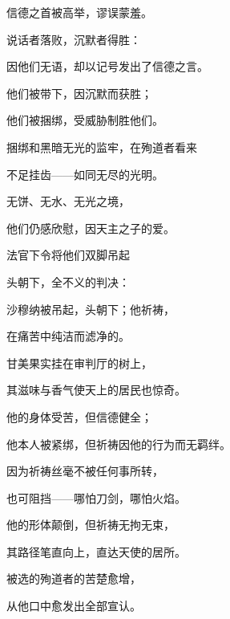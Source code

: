 信德之首被高举，谬误蒙羞。\par

说话者落败，沉默者得胜：\par

因他们无语，却以记号发出了信德之言。\par

他们被带下，因沉默而获胜；\par

他们被捆绑，受威胁制胜他们。\par

捆绑和黑暗无光的监牢，在殉道者看来\par

不足挂齿——如同无尽的光明。\par

无饼、无水、无光之境，\par

他们仍感欣慰，因天主之子的爱。\par

法官下令将他们双脚吊起\par

头朝下，全不义的判决：\par

沙穆纳被吊起，头朝下；他祈祷，\par

在痛苦中纯洁而滤净的。\par

甘美果实挂在审判厅的树上，\par

其滋味与香气使天上的居民也惊奇。\par

他的身体受苦，但信德健全；\par

他本人被紧绑，但祈祷因他的行为而无羁绊。\par

因为祈祷丝毫不被任何事所转，\par

也可阻挡——哪怕刀剑，哪怕火焰。\par

他的形体颠倒，但祈祷无拘无束，\par

其路径笔直向上，直达天使的居所。\par

被选的殉道者的苦楚愈增，\par

从他口中愈发出全部宣认。\par

